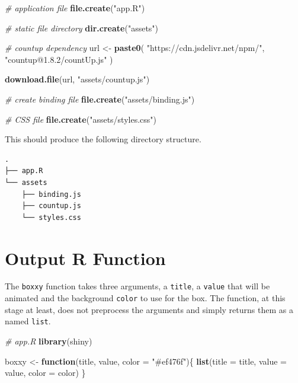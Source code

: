 \documentclass[
]{krantz}
\makeatletter
\newenvironment{Shaded}{\begin{snugshade}}{\end{snugshade}}
\newcommand{\CommentTok}[1]{\textcolor[rgb]{0.37,0.37,0.37}{\textit{#1}}}
\newcommand{\ControlFlowTok}[1]{\textcolor[rgb]{0.27,0.27,0.27}{\textbf{#1}}}
\newcommand{\DataTypeTok}[1]{\textcolor[rgb]{0.27,0.27,0.27}{#1}}
\newcommand{\KeywordTok}[1]{\textcolor[rgb]{0.27,0.27,0.27}{\textbf{#1}}}
\newcommand{\NormalTok}[1]{#1}
\newcommand{\StringTok}[1]{\textcolor[rgb]{0.5,0.5,0.5}{#1}}
\newenvironment{kframe}{%
\medskip{}
\setlength{\fboxsep}{.8em}
 \def\at@end@of@kframe{}%
 \ifinner\ifhmode%
  \def\at@end@of@kframe{\end{minipage}}%
  \begin{minipage}{\columnwidth}%
 \fi\fi%
 \def\FrameCommand##1{\hskip\@totalleftmargin \hskip-\fboxsep
 \colorbox{shadecolor}{##1}\hskip-\fboxsep
     \hskip-\linewidth \hskip-\@totalleftmargin \hskip\columnwidth}%
 \MakeFramed {\advance\hsize-\width
   \@totalleftmargin\z@ \linewidth\hsize
   \@setminipage}}%
 {\par\unskip\endMakeFramed%
 \at@end@of@kframe}
\renewenvironment{Shaded}{\begin{kframe}}{\end{kframe}}
\makeatother
\begin{document}
\begin{Shaded}
\begin{Highlighting}[]
\CommentTok{\# application file}
\KeywordTok{file.create}\NormalTok{(}\StringTok{"app.R"}\NormalTok{)}

\CommentTok{\# static file directory}
\KeywordTok{dir.create}\NormalTok{(}\StringTok{"assets"}\NormalTok{)}

\CommentTok{\# countup dependency}
\NormalTok{url <{-}}\StringTok{ }\KeywordTok{paste0}\NormalTok{(}
  \StringTok{"https://cdn.jsdelivr.net/npm/"}\NormalTok{,}
  \StringTok{"countup@1.8.2/countUp.js"}
\NormalTok{)}

\KeywordTok{download.file}\NormalTok{(url, }\StringTok{"assets/countup.js"}\NormalTok{)}

\CommentTok{\# create binding file}
\KeywordTok{file.create}\NormalTok{(}\StringTok{"assets/binding.js"}\NormalTok{)}

\CommentTok{\# CSS file}
\KeywordTok{file.create}\NormalTok{(}\StringTok{"assets/styles.css"}\NormalTok{)}
\end{Highlighting}
\end{Shaded}

This should produce the following directory structure.

\begin{verbatim}
.
├── app.R
└── assets
    ├── binding.js
    ├── countup.js
    └── styles.css
\end{verbatim}

\hypertarget{shiny-output-r-fun}{%
\section{Output R Function}\label{shiny-output-r-fun}}

The \texttt{boxxy} function takes three arguments, a \texttt{title}, a \texttt{value} that will be animated and the background \texttt{color} to use for the box. The function, at this stage at least, does not preprocess the arguments and simply returns them as a named \texttt{list}.

\begin{Shaded}
\begin{Highlighting}[]
\CommentTok{\# app.R}
\KeywordTok{library}\NormalTok{(shiny)}

\NormalTok{boxxy <{-}}\StringTok{ }\ControlFlowTok{function}\NormalTok{(title, value, }\DataTypeTok{color =} \StringTok{"\#ef476f"}\NormalTok{)\{}
  \KeywordTok{list}\NormalTok{(}\DataTypeTok{title =}\NormalTok{ title, }\DataTypeTok{value =}\NormalTok{ value, }\DataTypeTok{color =}\NormalTok{ color)}
\NormalTok{\}}
\end{Highlighting}
\end{Shaded}
\end{document}
